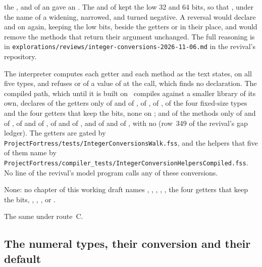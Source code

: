 \begin{description}
the  , and  of an  gave
an .
The  and  of  kept the low 32 and 64 bits,
so that , under the name of a widening, narrowed, and turned
 negative.
A reversal would declare  and  on  again,
keeping the low bits, beside the getters or in their place, and would remove the
methods that return their argument unchanged.
The full reasoning is in
\nolinkurl{explorations/reviews/integer-conversions-2026-11-06.md} in the
revival's repository.
\item[Effect] The interpreter computes each getter and each method as the text
states, on all five types, and refuses  or  of a value of
 at the call, which finds no declaration.
The compiled path, which until it is built on \library\ compiles against a
smaller library of its own, declares of the getters only  of
 and of ,  of ,
 of ,  of the four fixed-size types and
the four getters that keep the bits, none on ; and of the
methods only  of  and of ,
 of  and of ,  of
 and of , and  of
 and of , with no  (row~349 of the
revival's gap ledger).
The getters are gated by \nolinkurl{ProjectFortress/tests/IntegerConversionsWalk.fss},
and the helpers that five of them name by
\nolinkurl{ProjectFortress/compiler_tests/IntegerConversionHelpersCompiled.fss}.
No line of the revival's model program calls any of these conversions.
\item[Original text] None: no chapter of this working draft names ,
, , , , the four getters that keep
the bits, , , ,  or .
\item[Route C] The same under route~C.
\end{description}

\subsection{The numeral types, their conversion and their default}

